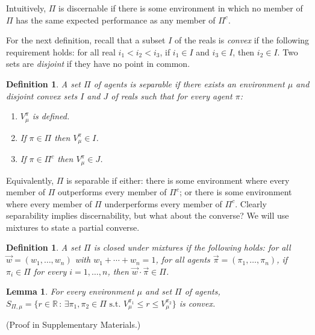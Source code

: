 \documentclass[twoside]{article}
\newtheorem{definition}[theorem]{Definition}
\newtheorem{lemma}[theorem]{Lemma}
\begin{document}
Intuitively, $\Pi$ is discernable if there is some environment in which
no member of $\Pi$ has the same expected performance as any member of $\Pi^c$.

For the next definition, recall that a subset $I$ of the reals
is \emph{convex} if the following requirement holds:
for all real $i_1<i_2<i_3$, if $i_1\in I$ and $i_3\in I$, then $i_2\in I$.
Two sets are \emph{disjoint} if they have no point in common.

\begin{definition}
\label{incentivizabilitydefn}
    A set $\Pi$ of agents is \emph{separable} if there exists
    an environment $\mu$ and disjoint convex sets $I$ and $J$ of
    reals such that for every agent $\pi$:
    \begin{enumerate}
        \item
        $V^\pi_\mu$ is defined.
        \item
        If $\pi\in \Pi$ then $V^\pi_\mu\in I$.
        \item
        If $\pi\in \Pi^c$ then $V^\pi_\mu\in J$.
    \end{enumerate}
\end{definition}

Equivalently, $\Pi$ is separable if either: there is some environment where
every member of $\Pi$ outperforms every member of $\Pi^c$; or there is some
environment where every member of $\Pi$ underperforms every member of $\Pi^c$.
Clearly separability implies discernability, but what about the converse?
We will use mixtures to state a partial converse.

\begin{definition}
\label{mixtureclosuredef}
    A set $\Pi$ is \emph{closed under mixtures} if the following
    holds: for all $\vec w=(w_1,\ldots,w_n)$
    with $w_1+\cdots+w_n=1$,
    for all agents $\vec\pi=(\pi_1,\ldots,\pi_n)$,
    if $\pi_i\in \Pi$ for every $i=1,\ldots,n$, then
    $\vec w\cdot\vec\pi\in\Pi$.
\end{definition}

\begin{lemma}
\label{convexsetlemma}
    For every environment $\mu$ and set $\Pi$ of agents,
    $
        S_{\Pi,\mu}=\{
            r\in\mathbb R
            \,:\,
            \exists \pi_1,\pi_2\in\Pi\mbox{ s.t. }V^{\pi_1}_\mu\leq r\leq V^{\pi_2}_\mu
        \}
    $
    is convex.
\end{lemma}
\vspace{-0.5em}(Proof in Supplementary Materials.)
\end{document}
